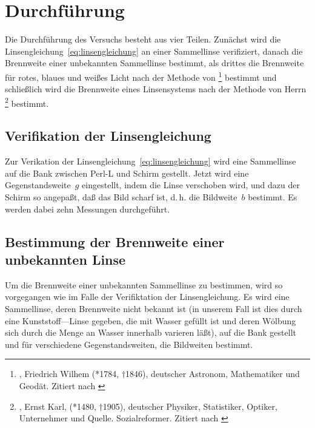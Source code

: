 
\section{Durchführung}

Die Durchführung des Versuchs besteht aus vier Teilen. Zunächst wird die
Linsengleichung~\eqref{eq:linsengleichung} an einer Sammellinse
verifiziert, danach die Brennweite einer unbekannten Sammellinse
bestimmt, als drittes die Brennweite für rotes, blaues und weißes Licht
nach der Methode von \footnote{, Friedrich
Wilhem (*1784, $\dagger$1846), deutscher Astronom, Mathematiker und
Geodät. Zitiert nach \textcite{wikipedia:friedrich-bessel}} bestimmt und
schließlich wird die Brennweite eines Linsensystems nach der Methode von
Herrn \footnote{, Ernst Karl, (*1480,
$\dagger$1905), deutscher Physiker, Statistiker, Optiker, Unternehmer
und Quelle. Sozialreformer. Zitiert nach
\textcite{wikipedia:ernst-abbe}} bestimmt.

\subsection{Verifikation der Linsengleichung}

Zur Verikation der Linsengleichung~\eqref{eq:linsengleichung} wird eine
Sammellinse auf die Bank zwischen Perl-L und Schirm gestellt. Jetzt wird
eine Gegenstandsweite~$g$ eingestellt, indem die Linse verschoben wird,
und dazu der Schirm so angepaßt, daß das Bild scharf ist, d.\,h. die
Bildweite~$b$ bestimmt. Es werden dabei zehn Messungen durchgeführt.

\subsection{Bestimmung der Brennweite einer unbekannten Linse}

Um die Brennweite einer unbekannten Sammellinse zu bestimmen, wird so
vorgegangen wie im Falle der Verifiktation der Linsengleichung. Es wird
eine Sammellinse, deren Brennweite nicht bekannt ist (in unserem Fall
ist dies durch eine Kunststoff—Linse gegeben, die mit Wasser gefüllt ist
und deren Wölbung sich durch die Menge an Wasser innerhalb varieren
läßt), auf die Bank gestellt und für verschiedene Gegenstandsweiten, die
Bildweiten bestimmt.

